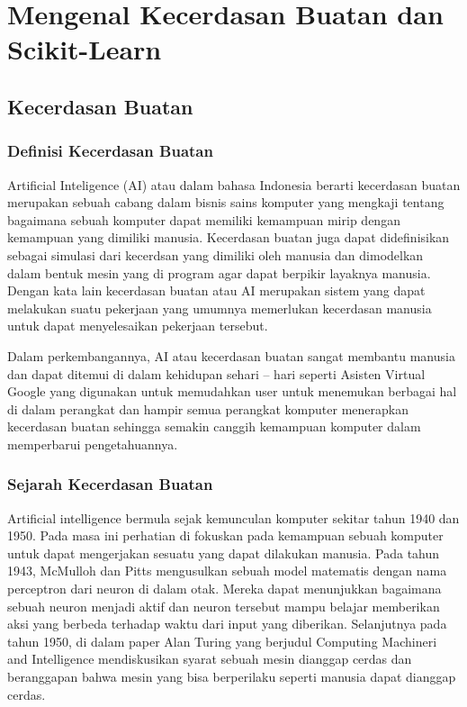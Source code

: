 \chapter{Mengenal Kecerdasan Buatan dan Scikit-Learn}
\section{Kecerdasan Buatan}
    \subsection{Definisi Kecerdasan Buatan}
    Artificial Inteligence (AI)  atau dalam bahasa Indonesia berarti  kecerdasan buatan merupakan sebuah cabang dalam bisnis sains komputer yang mengkaji tentang bagaimana sebuah komputer dapat memiliki kemampuan mirip dengan kemampuan yang dimiliki manusia. Kecerdasan buatan juga dapat didefinisikan sebagai simulasi dari kecerdsan yang dimiliki oleh manusia dan dimodelkan dalam bentuk mesin yang di program agar dapat berpikir layaknya manusia. Dengan kata lain kecerdasan buatan atau AI merupakan sistem  yang dapat melakukan suatu pekerjaan yang umumnya memerlukan kecerdasan manusia untuk dapat menyelesaikan pekerjaan tersebut. 

    Dalam perkembangannya, AI atau kecerdasan buatan sangat membantu manusia dan dapat ditemui di dalam kehidupan sehari – hari seperti Asisten Virtual Google yang digunakan untuk memudahkan user untuk menemukan berbagai hal di dalam perangkat dan hampir semua perangkat komputer menerapkan kecerdasan buatan sehingga semakin canggih kemampuan komputer  dalam memperbarui pengetahuannya.

    \subsection{Sejarah Kecerdasan Buatan}
    Artificial intelligence bermula sejak kemunculan komputer sekitar tahun 1940 dan 1950. Pada masa ini perhatian di fokuskan pada kemampuan sebuah komputer untuk dapat mengerjakan sesuatu yang dapat dilakukan manusia. Pada tahun 1943, McMulloh dan Pitts mengusulkan sebuah model matematis dengan nama perceptron dari neuron di dalam otak. Mereka dapat menunjukkan bagaimana sebuah neuron menjadi aktif dan neuron tersebut mampu belajar memberikan aksi yang berbeda terhadap waktu dari input yang diberikan. Selanjutnya pada tahun 1950, di dalam paper Alan Turing yang berjudul Computing Machineri and Intelligence mendiskusikan syarat sebuah mesin dianggap cerdas dan beranggapan bahwa mesin yang bisa berperilaku seperti manusia dapat dianggap cerdas.

